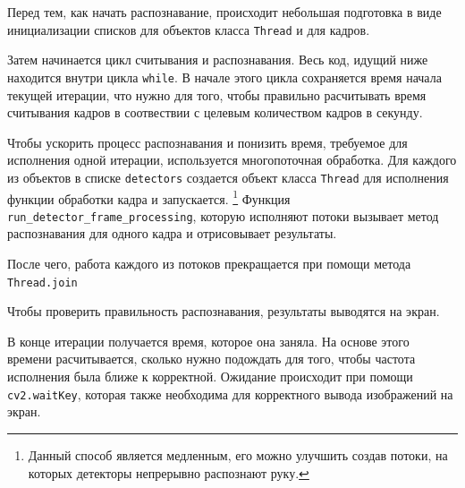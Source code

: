 \documentclass[12pt, a4paper]{article}
\begin{document}
Перед тем, как начать распознавание, происходит небольшая подготовка в виде
инициализации списков для объектов класса \texttt{Thread} и для кадров.

Затем начинается цикл считывания и распознавания. Весь код, идущий ниже
находится внутри цикла \texttt{while}. В начале этого цикла сохраняется время
начала текущей итерации, что нужно для того, чтобы правильно расчитывать время
считывания кадров в соотвествии с целевым количеством кадров в секунду.

Чтобы ускорить процесс распознавания и понизить время, требуемое для исполнения
одной итерации, используется многопоточная обработка. Для каждого из объектов в
списке \texttt{detectors} создается объект класса \texttt{Thread} для
исполнения функции обработки кадра и запускается.
\footnote{Данный способ является медленным, его можно улучшить создав потоки, на
которых детекторы непрерывно распознают руку.}
Функция \texttt{run\_detector\_frame\_processing}, которую исполняют потоки
вызывает метод распознавания для одного кадра и отрисовывает результаты.

После чего, работа каждого из потоков прекращается при помощи метода \texttt{Thread.join}

Чтобы проверить правильность распознавания, результаты выводятся на экран.

В конце итерации получается время, которое она заняла. На основе этого времени
расчитывается, сколько нужно подождать для того, чтобы частота исполнения была
ближе к корректной. Ожидание происходит при помощи \texttt{cv2.waitKey},
которая также необходима для корректного вывода изображений на экран.
\end{document}
